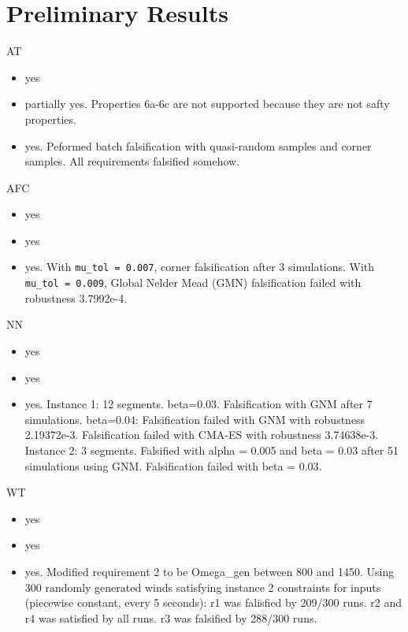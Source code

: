 	\section{Preliminary Results}

	AT

	\begin{itemize}
		\item \FalStar yes
		\item \falsify partially yes.  Properties 6a-6c are not supported because they are not safty properties.
		\item \Breach yes. Peformed batch falsification with quasi-random samples and corner samples. All requirements falsified somehow.
	\end{itemize}

	AFC

	\begin{itemize}
		\item \FalStar yes
		\item \falsify yes
		\item \Breach yes. With \verb+mu_tol = 0.007+, corner falsification after 3 simulations. With \verb+mu_tol = 0.009+, Global Nelder Mead (GMN) falsification failed  with robustness 3.7992e-4.
	\end{itemize}

	NN

	\begin{itemize}
		\item \FalStar yes
		\item \falsify yes
		\item \Breach yes. Instance 1: 12 segments. beta=0.03. Falsification with GNM after 7 simulations. beta=0.04: Falsification failed with GNM with robustness 2.19372e-3. Falsification failed with CMA-ES with robustness 3.74638e-3. Instance 2: 3 segments. Falsified with alpha = 0.005 and beta = 0.03 after 51 simulations using GNM. Falsification failed with beta = 0.03.
	\end{itemize}

	WT

	\begin{itemize}
		\item \FalStar yes
		\item \falsify yes
		\item \Breach yes. Modified requirement 2 to be Omega\_gen between 800 and 1450. Using 300 randomly generated winds satisfying instance 2 constraints for inputs (piecewise constant, every 5 seconds): r1 was falisfied by 209/300 runs. r2 and r4 was satisfied by all runs. r3 was falsified by 288/300 runs.
	\end{itemize}

